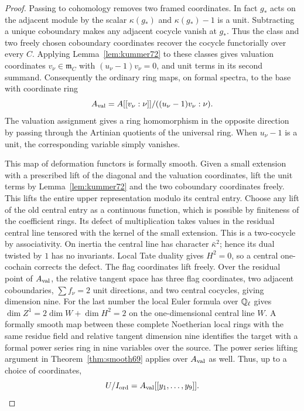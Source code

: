 \documentclass[a4paper,11pt]{article}
\theoremstyle{definition}
\theoremstyle{remark}
\numberwithin{equation}{section}
\begin{document}
\begin{proof}
Passing to cohomology removes two framed coordinates.
In fact \(g_*\) acts on the adjacent module by the scalar
\(\kappa(g_*)\) and \(\kappa(g_*)-1\) is a unit.
Subtracting a unique coboundary makes any adjacent cocycle
vanish at \(g_*\). Thus the class and two freely chosen
coboundary coordinates recover the cocycle functorially over
every \(C\). Applying Lemma~\ref{lem:kummer72} to these
classes gives valuation coordinates \(v_\nu\in\mathfrak m_C\)
with \((u_\nu-1)v_\nu=0\), and unit terms in its second summand.
Consequently the ordinary ring maps, on formal spectra, to
the base with coordinate ring
\[
      A_{\rm val}=A[[v_\nu:\nu]]/
                         ((u_\nu-1)v_\nu:\nu).
\]
The valuation assignment gives a ring homomorphism in the
opposite direction by passing through the Artinian quotients
of the universal ring. When \(u_\nu-1\) is a unit, the
corresponding variable simply vanishes.

This map of deformation functors is formally smooth.
Given a small extension with a prescribed lift of the
diagonal and the valuation coordinates, lift the unit terms
by Lemma~\ref{lem:kummer72} and the two coboundary coordinates
freely. This lifts the entire upper representation modulo its
central entry. Choose any lift of the old central entry as
a continuous function, which is possible by finiteness of
the coefficient rings. Its defect of multiplication takes
values in the residual central line tensored with the kernel
of the small extension. This is a two-cocycle by associativity.
On inertia the central line has character \(\bar\kappa^2\);
hence its dual twisted by \(1\) has no invariants. Local
Tate duality gives \(H^2=0\), so a central one-cochain
corrects the defect. The flag coordinates lift freely.
Over the residual point of \(A_{\rm val}\), the relative
tangent space has three flag coordinates, two adjacent
coboundaries, \(\sum f_\nu=2\) unit directions, and two
central cocycles, giving dimension nine. For the last number the local Euler formula
over \(\mathbb Q_\ell\) gives \(\dim Z^1=2\dim W+\dim H^2=2\)
on the one-dimensional central line \(W\).
A formally smooth map between these complete Noetherian local
rings with the same residue field and relative tangent dimension
nine identifies the target with a formal power series ring in
nine variables over the source. The power series lifting argument
in Theorem~\ref{thm:smooth69} applies over \(A_{\rm val}\)
as well. Thus, up to a choice of coordinates,
\[
                       U/I_{\rm ord}=A_{\rm val}[[y_1,\ldots,y_9]].
\]


\end{proof}
\end{document}
